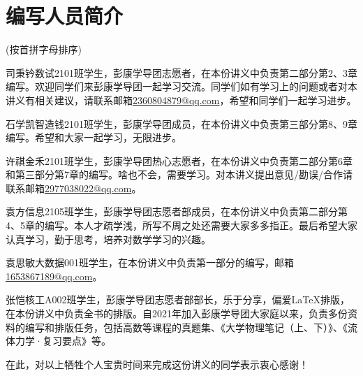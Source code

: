 \chapter*{编写人员简介}
\vspace{-3cm}

(按首拼字母排序)

\vspace{1em}

{\color{lbdeepblue}司秉钤}\quad 数试2101班学生，彭康学导团志愿者，在本份讲义中负责第二部分第2、3章编写。欢迎同学们来彭康学导团一起学习交流。同学们如有学习上的问题或者对本讲义有相关建议，请联系邮箱\url{2360804879@qq.com}，希望和同学们一起学习进步。

\vspace{1em}

{\color{lbdeepblue}石学凯}\quad 智造钱2101班学生，彭康学导团成员，在本份讲义中负责第三部分第8、9章编写。希望和大家一起学习，无限进步。

\vspace{1em}

{\color{lbdeepblue}许祺}\quad 金禾2101班学生，彭康学导团热心志愿者，在本份讲义中负责第二部分第6章和第三部分第7章的编写。啥也不会，需要学习。对本讲义提出意见/勘误/合作请联系邮箱\url{2977038022@qq.com}。

\vspace{1em}
{\color{lbdeepblue}袁方}\quad 信息2105班学生，彭康学导团志愿者部成员，在本份讲义中负责第二部分第4、5章的编写。本人才疏学浅，所写不周之处还需要大家多多指正。最后希望大家认真学习，勤于思考，培养对数学学习的兴趣。

\vspace{1em}

{\color{lbdeepblue}袁思敏}\quad 大数据001班学生，在本份讲义中负责第一部分的编写，邮箱\url{1653867189@qq.com}。

\vspace{1em}

{\color{lbdeepblue}张恺}\quad 核工A002班学生，彭康学导团志愿者部部长，乐于分享，偏爱\LaTeX 排版，在本份讲义中负责全书的排版。自2021年加入彭康学导团大家庭以来，负责多份资料的编写和排版任务，包括高数等课程的真题集、《大学物理笔记（上、下）》、《流体力学·复习要点》等。

\vspace{2em}

在此，对以上牺牲个人宝贵时间来完成这份讲义的同学表示衷心感谢！
